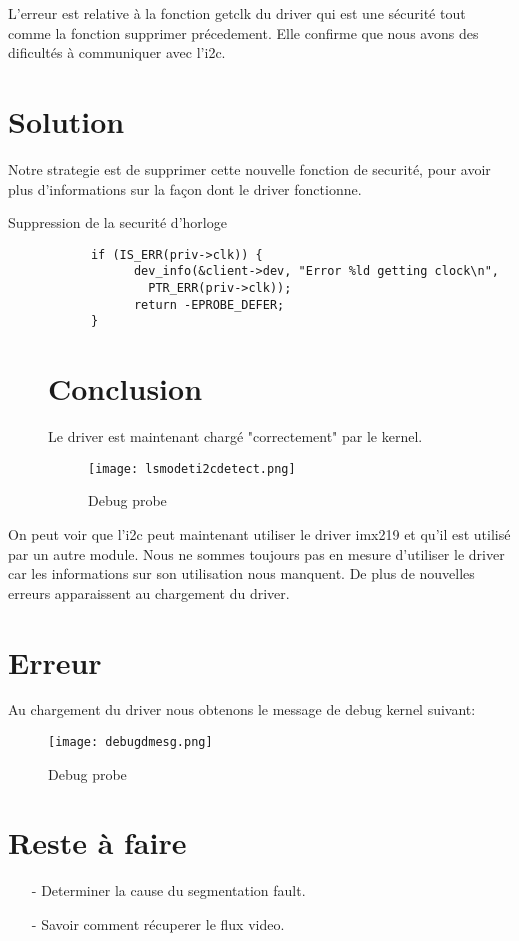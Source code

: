 L'erreur est relative à la fonction getclk du driver qui est une sécurité
 tout comme la fonction supprimer précedement.
Elle confirme que nous avons des dificultés à communiquer avec l'i2c.

\section{Solution}
Notre strategie est de supprimer cette nouvelle fonction de securité, pour avoir plus
d'informations sur la façon dont le driver fonctionne.
\begin{description}
  \item[Suppression de la securité d'horloge]
    \begin{lstlisting}
	  if (IS_ERR(priv->clk)) {
		    dev_info(&client->dev, "Error %ld getting clock\n",
			  PTR_ERR(priv->clk));
		    return -EPROBE_DEFER;
	  }
    \end{lstlisting}
\section{Conclusion}
Le driver est maintenant chargé "correctement" par le kernel.

\begin{figure}[th]
  \centering
  \texttt{[image: lsmodeti2cdetect.png]}
  \decoRule
  \caption{Debug probe}  \label{fig:planning}
\end{figure}

    \clearpage
  \end{description}

  On peut voir que l'i2c peut maintenant utiliser le driver imx219 et
  qu'il est utilisé par un autre module. Nous ne sommes toujours pas en mesure
  d'utiliser le driver car les informations sur son utilisation nous manquent.
  De plus de nouvelles erreurs apparaissent au chargement du driver.

  \section{Erreur}
  Au chargement du driver nous obtenons le message de debug kernel suivant:

  \begin{figure}[th]
    \centering
    \texttt{[image: debugdmesg.png]}
    \decoRule
    \caption{Debug probe}  \label{fig:planning}
  \end{figure}

  \section{Reste à faire}

  \begin{itemize}
  \item[-] Determiner la cause du segmentation fault.
  \item[-] Savoir comment récuperer le flux video.
  \end{itemize}
